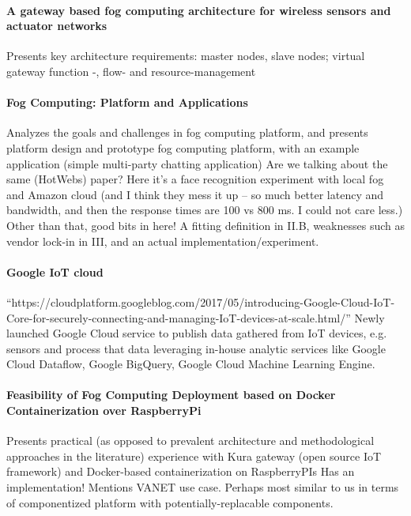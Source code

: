 \paragraph{A gateway based fog computing architecture for wireless sensors and actuator networks \cite{7423332}}
Presents key architecture requirements: master nodes, slave nodes; virtual gateway function -, flow- and resource-management

\paragraph{Fog Computing: Platform and Applications} \cite{yi_fog_2015}
Analyzes the goals and challenges in fog computing platform, and presents platform design and prototype fog computing platform, with an example application (simple multi-party chatting application)
Are we talking about the same (HotWebs) paper? Here it's a face recognition
experiment with local fog and Amazon cloud (and I think they mess it up --
so much better latency and bandwidth, and then the response times are 100 vs
800 ms. I could not care less.) Other than that, good bits in here!
A fitting definition in II.B, weaknesses such as vendor lock-in in III,
and an actual implementation/experiment.

\paragraph{Google IoT cloud}
``https://cloudplatform.googleblog.com/2017/05/introducing-Google-Cloud-IoT-Core-for-securely-connecting-and-managing-IoT-devices-at-scale.html/'' Newly launched Google Cloud service to publish data gathered from IoT devices, e.g. sensors and process that data leveraging in-house analytic services like Google Cloud Dataflow, Google BigQuery, Google Cloud Machine Learning Engine.

\paragraph{Feasibility of Fog Computing Deployment based on Docker Containerization over RaspberryPi} \cite{bellavista_feasibility_2017}
Presents practical (as opposed to prevalent architecture and methodological approaches in the literature) experience with Kura gateway (open source IoT framework) and Docker-based containerization on RaspberryPIs
Has an implementation! Mentions VANET use case. Perhaps most similar to us in terms of componentized platform with potentially-replacable components.

